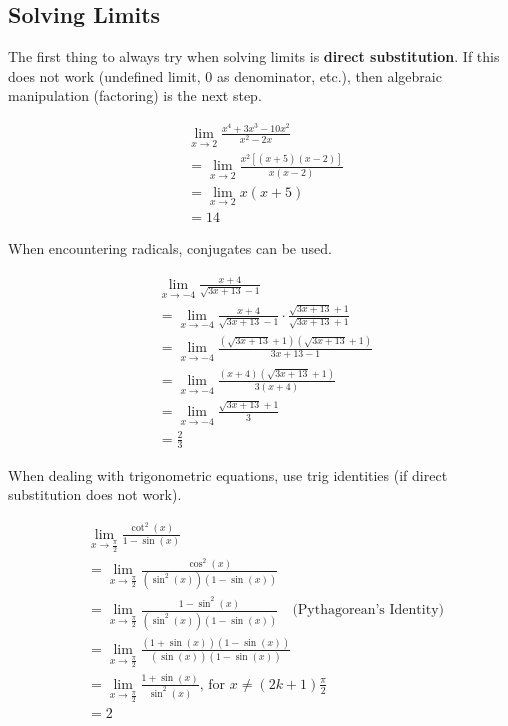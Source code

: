 \documentclass[12pt]{article}
\begin{document}
        \subsection{Solving Limits}
            The first thing to always try when solving limits is \textbf{direct substitution}. If this does not work (undefined limit, 0 as denominator, etc.), then algebraic manipulation (factoring) is the next step.

            \begin{align*}
                &\lim_{x \to 2} \frac{x^4 + 3x^3 - 10x^2}{x^2 - 2x} \\[6pt]
                &= \lim_{x \to 2} \frac{x^2\left[ (x+5)(x-2) \right]}{x(x-2)} \\
                &= \lim_{x \to 2} x(x+5) \\
                &= 14
            \end{align*}

            \noindent When encountering radicals, conjugates can be used.

            \begin{align*}
                &\lim_{x \to -4} \frac{x+4}{\sqrt{3x+13}-1} \\[6pt]
                &= \lim_{x \to -4} \frac{x+4}{\sqrt{3x+13}-1} \cdot \frac{\sqrt{3x+13}+1}{\sqrt{3x+13}+1} \\[6pt]
                &= \lim_{x \to -4} \frac{(\sqrt{3x+13}+1)(\sqrt{3x+13}+1)}{3x+13-1} \\[6pt]
                &= \lim_{x \to -4} \frac{(x+4)(\sqrt{3x+13}+1)}{3(x+4)} \\[6pt]
                &= \lim_{x \to -4} \frac{\sqrt{3x+13}+1}{3} \\[6pt]
                &= \frac{2}{3}
            \end{align*}

            \noindent When dealing with trigonometric equations, use trig identities (if direct substitution does not work).

            \begin{align*}
                &\lim_{x \to \frac{\pi}{2}} \frac{\cot^2(x)}{1-\sin(x)} \\[6pt]
                &= \lim_{x \to \frac{\pi}{2}} \frac{\cos^2(x)}{\left( \sin^2(x) \right)\left(1-\sin(x)\right)} \\[6pt]
                &= \lim_{x \to \frac{\pi}{2}} \frac{1-\sin^2(x)}{\left( \sin^2(x) \right)\left(1-\sin(x)\right)} \quad \text{(Pythagorean's Identity)} \\[6pt]
                &= \lim_{x \to \frac{\pi}{2}} \frac{\left( 1+\sin(x) \right)\left( 1-\sin(x) \right)}{\left( \sin(x) \right)\left(1-\sin(x)\right)} \\[6pt]
                &= \lim_{x \to \frac{\pi}{2}} \frac{1+\sin(x)}{\sin^2(x)} \text{, for } x \ne (2k+1)\frac{\pi}{2}\\[6pt]
                &= 2
            \end{align*}
\end{document}
